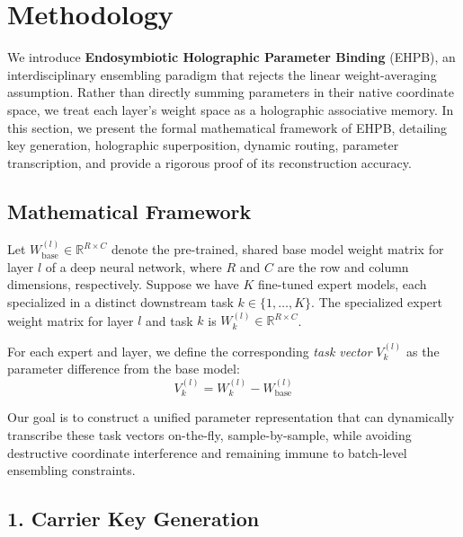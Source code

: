 \section{Methodology}
\label{sec:method}

We introduce \textbf{Endosymbiotic Holographic Parameter Binding} (EHPB), an interdisciplinary ensembling paradigm that rejects the linear weight-averaging assumption. Rather than directly summing parameters in their native coordinate space, we treat each layer's weight space as a holographic associative memory. In this section, we present the formal mathematical framework of EHPB, detailing key generation, holographic superposition, dynamic routing, parameter transcription, and provide a rigorous proof of its reconstruction accuracy.

\subsection{Mathematical Framework}

Let $W_{\text{base}}^{(l)} \in \mathbb{R}^{R \times C}$ denote the pre-trained, shared base model weight matrix for layer $l$ of a deep neural network, where $R$ and $C$ are the row and column dimensions, respectively. Suppose we have $K$ fine-tuned expert models, each specialized in a distinct downstream task $k \in \{1, \dots, K\}$. The specialized expert weight matrix for layer $l$ and task $k$ is $W_k^{(l)} \in \mathbb{R}^{R \times C}$. 

For each expert and layer, we define the corresponding \textit{task vector} $V_k^{(l)}$ as the parameter difference from the base model:
\begin{equation}
V_k^{(l)} = W_k^{(l)} - W_{\text{base}}^{(l)}
\end{equation}

Our goal is to construct a unified parameter representation that can dynamically transcribe these task vectors on-the-fly, sample-by-sample, while avoiding destructive coordinate interference and remaining immune to batch-level ensembling constraints.

\subsection{1. Carrier Key Generation}

